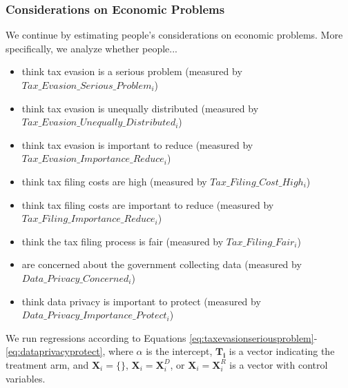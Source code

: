 \documentclass[11pt]{article}
\begin{document}
\subsubsection{Considerations on Economic Problems}
We continue by estimating people's considerations on economic problems. More specifically, we analyze whether people... 
\begin{itemize}
    \item think tax evasion is a serious problem (measured by $Tax\_Evasion\_Serious\_Problem_i$)
    \item think tax evasion is unequally distributed (measured by $Tax\_Evasion\_Unequally\_Distributed_i$)
    \item think tax evasion is important to reduce (measured by $Tax\_Evasion\_Importance\_Reduce_i$)
    \item think tax filing costs are high (measured by $Tax\_Filing\_Cost\_High_i$)
    \item think tax filing costs are important to reduce (measured by $Tax\_Filing\_Importance\_Reduce_i$)
    \item think the tax filing process is fair (measured by $Tax\_Filing\_Fair_i$)
    \item are concerned about the government collecting data (measured by $Data\_Privacy\_Concerned_i$)
    \item think data privacy is important to protect (measured by $Data\_Privacy\_Importance\_Protect_i$)
\end{itemize}

We run regressions according to Equations \ref{eq:taxevasionseriousproblem}-\ref{eq:dataprivacyprotect}, where $\alpha$ is the intercept, $\mathbf{T_i}$ is a vector indicating the treatment arm, and $\mathbf{X}_{i} = \{\}$, $\mathbf{X}_{i} = \mathbf{X}_{i}^{D}$, or  $\mathbf{X}_{i} = \mathbf{X}_{i}^{R}$ is a vector with control variables. 
\end{document}

